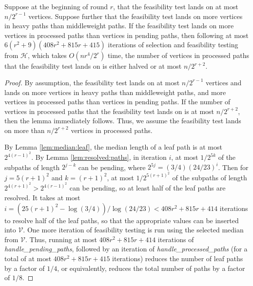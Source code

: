 \begin{lemma}
\label{lem:processed:paths}
Suppose at the beginning of round $r$, that the feasibility test lands on at most $n/2^{r-1}$ vertices. 
Suppose further that the feasibility test lands on more vertices in heavy paths than middleweight paths. 
If the feasibility test lands on more vertices in processed paths than vertices in pending paths, then following at most $6(r^2+9)(408r^2+815r+415)$ iterations of selection and feasibility testing from $\mathcal{H}$, which takes $O(nr^4/2^r)$ time, the number of vertices in processed paths that the feasibility test lands on is either halved or at most $n/2^{r+2}$.
\end{lemma}
\begin{proof}
By assumption, the feasibility test lands on at most $n/2^{r-1}$ vertices and lands on more vertices in heavy paths than middleweight paths, and more vertices in processed paths than vertices in pending paths. 
If the number of vertices in processed paths that the feasibility test lands on is at most $n/2^{r+2}$, then the lemma immediately follows. 
Thus, we assume the feasibility test lands on more than $n/2^{r+2}$ vertices in processed paths.

By Lemma \ref{lem:median:leaf}, the median length of a leaf path is at most $2^{4(r-1)^2}$. 
By Lemma \ref{lem:resolved:paths}, in iteration $i$, at most $1/2^{5k}$ of the subpaths of length $2^{j-k}$ can be pending, where $2^{5j}=(3/4)(24/23)^i$. 
Then for $j=5(r+1)^2$ and $k=(r+1)^2$, at most $1/2^{5(r+1)^2}$ of the subpaths of length $2^{4(r+1)^2}>2^{4(r-1)^2}$ can be pending, so at least half of the leaf paths are resolved. 
It takes at most $i=(25(r+1)^2-\log(3/4))/\log(24/23)<408r^2+815r+414$ iterations to resolve half of the leaf paths, so that the appropriate values can be inserted into $\mathcal{V}$. 
One more iteration of feasibility testing is run using the selected median from $\mathcal{V}$. 
Thus, running at most $408r^2+815r+414$ iterations of {\it handle\_pending\_paths}, followed by an iteration of {\it handle\_processed\_paths}  (for a total of at most $408r^2+815r+415$ iterations) reduces the number of leaf paths by a factor of $1/4$, or equivalently, reduces the total number of paths by a factor of $1/8$.


\end{proof}
